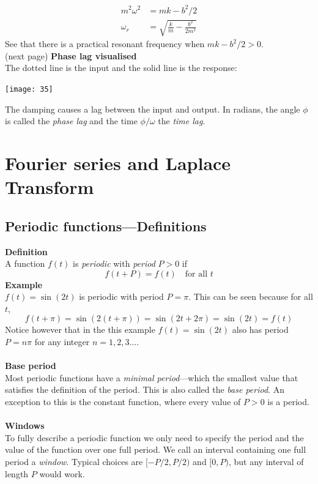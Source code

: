 \documentclass{report}
\begin{document}
\begin{align*}
m^2\omega^2&=mk-b^2/2\\
\omega_r&=\sqrt{\frac{k}{m}-\frac{b^2}{2m^2}}
\end{align*}
See that there is a practical resonant frequency when $mk-b^2/2>0$.\\
(next page)
\newpage
\noindent\textbf{Phase lag visualised}\\
The dotted line is the input and the solid line is the response:
\begin{center}
\texttt{[image: 35]}\\
\end{center}
The damping causes a lag between the input and output. In radians, the angle $\phi$ is called the
\textit{phase lag} and the time $\phi/\omega$ the \textit{time lag}.
\newpage

\section{Fourier series and Laplace Transform}
\subsection{Periodic functions---Definitions}
\textbf{Definition}\\
A function $f(t)$ is \textit{periodic} with \textit{period} $P>0$ if
\begin{equation*}
f(t+P)=f(t)\quad\text{for all }t
\end{equation*}
\textbf{Example}\\
$f(t)=\sin(2t)$ is periodic with period $P=\pi$. This can be seen because for all $t$,
\begin{equation*}
f(t+\pi)=\sin(2(t+\pi))=\sin(2t+2\pi)=\sin(2t)=f(t)
\end{equation*}
Notice however that in the this example $f(t)=\sin(2t)$ also has period $P=n\pi$ for any integer $n=1,2,3\ldots$.\\
\vspace{1mm}\\
\textbf{Base period}\\
Most periodic functions have a \textit{minimal period}---which the smallest value that satisfies the definition
of the period. This is also called the \textit{base period}. An exception to this is the constant function,
where every value of $P>0$ is a period.\\
\vspace{1mm}\\
\textbf{Windows}\\
To fully describe a periodic function we only need to specify the period and the value of the function over
one full period. We call an interval containing one full
period a \textit{window}. Typical choices are $[-P/2,P/2)$ and $[0,P)$, but any interval of length $P$ would work.
\newpage
\end{document}
